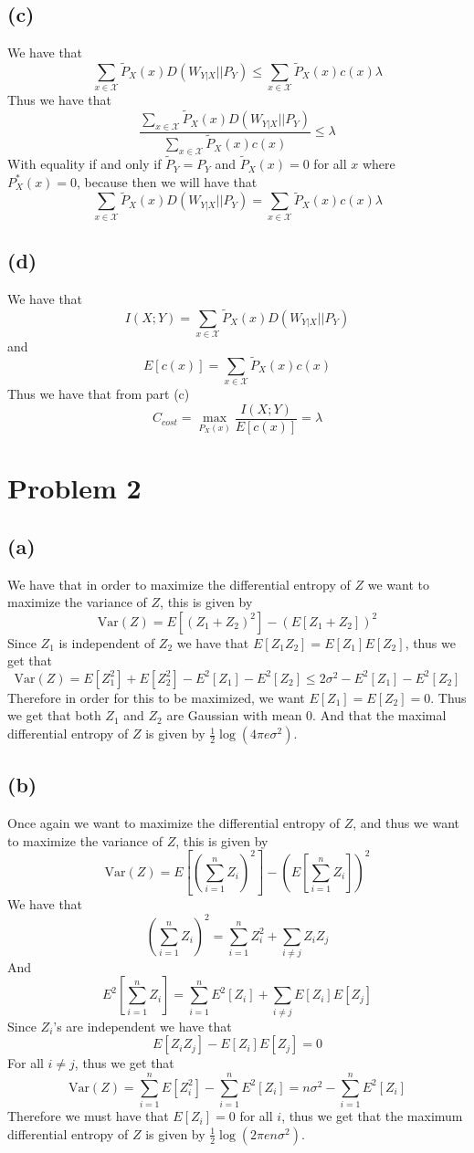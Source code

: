 \subsection*{(c)}
We have that
$$\sum_{x\in \mathcal{X}}\tilde{P}_X(x)D(W_{Y|X}||P_Y)\leq \sum_{x\in \mathcal{X}}\tilde{P}_X(x)c(x)\lambda$$
Thus we have that
$$\frac{\sum_{x\in \mathcal{X}}\tilde{P}_X(x)D(W_{Y|X}||P_Y)}{\sum_{x\in \mathcal{X}}\tilde{P}_X(x)c(x)}\leq \lambda$$
With equality if and only if $\tilde{P}_Y=P_Y$ and $\tilde{P}_X(x)=0$ for all 
$x$ where $P^*_X(x)=0$, because then we will have that 
$$\sum_{x\in \mathcal{X}}\tilde{P}_X(x)D(W_{Y|X}||P_Y)= \sum_{x\in \mathcal{X}}\tilde{P}_X(x)c(x)\lambda$$
\subsection*{(d)}
We have that 
$$I(X;Y)=\sum_{x\in \mathcal{X}}\tilde{P}_X(x)D(W_{Y|X}||P_Y)$$
and 
$$E[c(x)]=\sum_{x\in \mathcal{X}}\tilde{P}_X(x)c(x)$$
Thus we have that from part (c)
$$C_{cost}=\max_{P_X(x)}\frac{I(X;Y)}{E[c(x)]}=\lambda$$
\section*{Problem 2}
\subsection*{(a)}
We have that in order to maximize the 
differential entropy of $Z$ we want to maximize
the variance of $Z$, this is given by 
$$\text{Var}(Z)=E[(Z_1+Z_2)^2]-(E[Z_1+Z_2])^2$$
Since $Z_1$ is independent of $Z_2$ we have that
$E[Z_1Z_2]=E[Z_1]E[Z_2]$, thus we get that 
$$\text{Var}(Z)=E[Z_1^2]+E[Z_2^2]-E^2[Z_1]-E^2[Z_2]\leq 2\sigma^2 -E^2[Z_1]-E^2[Z_2]$$
Therefore in order for this to be maximized, we want $E[Z_1]=E[Z_2]=0$. 
Thus we get that both $Z_1$ and $Z_2$ are Gaussian with mean 0. And that 
the maximal differential entropy of $Z$ is given by $\frac{1}{2}\log(4\pi e\sigma^2)$.
\subsection*{(b)}
Once again we want to maximize the differential entropy of $Z$,
and thus we want to maximize the variance of $Z$, this is given by
$$\text{Var}(Z)=E[(\sum_{i=1}^{n}Z_i)^2]-(E[\sum_{i=1}^{n}Z_i])^2$$
We have that 
$$\left(\sum_{i=1}^{n}Z_i\right)^2=\sum_{i=1}^{n}Z_i^2+\sum_{i\neq j}Z_iZ_j$$
And
$$E^2[\sum_{i=1}^{n}Z_i]=\sum_{i=1}^{n}E^2[Z_i]+\sum_{i\neq j}E[Z_i]E[Z_j]$$
Since $Z_i$'s are independent we have that
$$E[Z_iZ_j]-E[Z_i]E[Z_j]=0$$
For all $i\neq j$, thus we get that
$$\text{Var}(Z)=\sum_{i=1}^{n}E[Z_i^2]-\sum_{i=1}^{n}E^2[Z_i]=n\sigma^2-\sum_{i=1}^{n}E^2[Z_i]$$
Therefore we must have that $E[Z_i]=0$ for all $i$, thus we get that
the maximum differential entropy of $Z$ is given by $\boxed{\frac{1}{2}\log(2\pi e n\sigma^2)}$.
